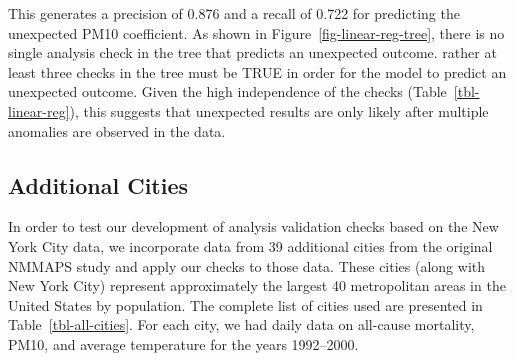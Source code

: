 \documentclass[
  12pt,
]{interact}
\begin{document}
This generates a precision of 0.876 and a recall of 0.722 for predicting
the unexpected PM10 coefficient. As shown in
Figure~\ref{fig-linear-reg-tree}, there is no single analysis check in
the tree that predicts an unexpected outcome. rather at least three
checks in the tree must be TRUE in order for the model to predict an
unexpected outcome. Given the high independence of the checks
(Table~\ref{tbl-linear-reg}), this suggests that unexpected results are
only likely after multiple anomalies are observed in the data.

\subsection{Additional Cities}\label{additional-cities}

In order to test our development of analysis validation checks based on
the New York City data, we incorporate data from 39 additional cities
from the original NMMAPS study and apply our checks to those data. These
cities (along with New York City) represent approximately the largest 40
metropolitan areas in the United States by population. The complete list
of cities used are presented in Table~\ref{tbl-all-cities}. For each
city, we had daily data on all-cause mortality, PM10, and average
temperature for the years 1992--2000.
\end{document}
